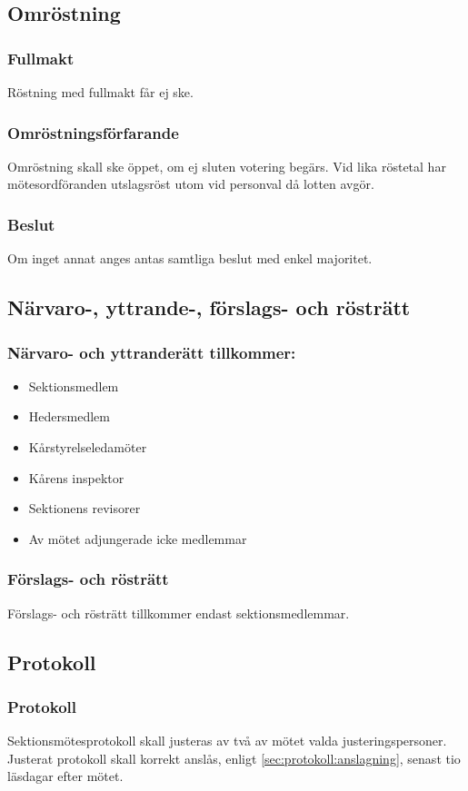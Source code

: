 \subsection{Omröstning}

\subsubsection{Fullmakt}
Röstning med fullmakt får ej ske.

\subsubsection{Omröstningsförfarande}
Omröstning skall ske öppet, om ej sluten votering begärs. Vid lika röstetal har mötesordföranden utslagsröst utom vid personval då lotten avgör.

\subsubsection{Beslut}
Om inget annat anges antas samtliga beslut med enkel majoritet.

\subsection{Närvaro-, yttrande-, förslags- och rösträtt}

\subsubsection{Närvaro- och yttranderätt tillkommer:}
\begin{itemize}
	\item Sektionsmedlem
	\item Hedersmedlem
	\item Kårstyrelseledamöter
	\item Kårens inspektor
	\item Sektionens revisorer
	\item Av mötet adjungerade icke medlemmar
\end{itemize}

\subsubsection{Förslags- och rösträtt}
Förslags- och rösträtt tillkommer endast sektionsmedlemmar.

\subsection{Protokoll}

\subsubsection{Protokoll}
Sektionsmötesprotokoll skall justeras av två av mötet valda justeringspersoner. Justerat protokoll skall korrekt anslås, enligt \ref{sec:protokoll:anslagning}, senast tio läsdagar efter mötet.